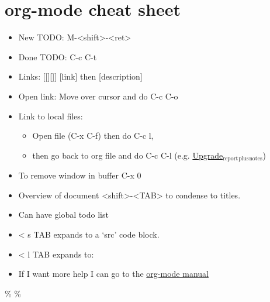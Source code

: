 \documentclass[11pt]{article}
\begin{document}
\section{org-mode cheat sheet}
\label{sec:org01b1324}
\begin{itemize}
\item New TODO: M-<shift>-<ret>
\item Done TODO: C-c C-t
\item Links: [[][]] [link] then [description]
\item Open link: Move over cursor and do C-c C-o
\item Link to local files:
\begin{itemize}
\item Open file (C-x C-f) then do C-c l,
\item then go back to org file and do C-c C-l (e.g. \href{file:///home/tigany/Documents/docs/PhDPaperSummary/upgrade\_rep\_plus\_notes.tex}{Upgrade\(_{\text{report}}\)\(_{\text{plus}}\)\(_{\text{notes}}\)})
\end{itemize}
\item To remove window in buffer C-x 0
\item Overview of document <shift>-<TAB> to condense to titles.
\item Can have global todo list
\item < s TAB expands to a ‘src’ code block.
\item < l TAB expands to:
\end{itemize}


\begin{itemize}
\item If I want more help I can go to the \href{https://orgmode.org/manual/}{org-mode manual}
\end{itemize}




\%
\%
\end{document}
